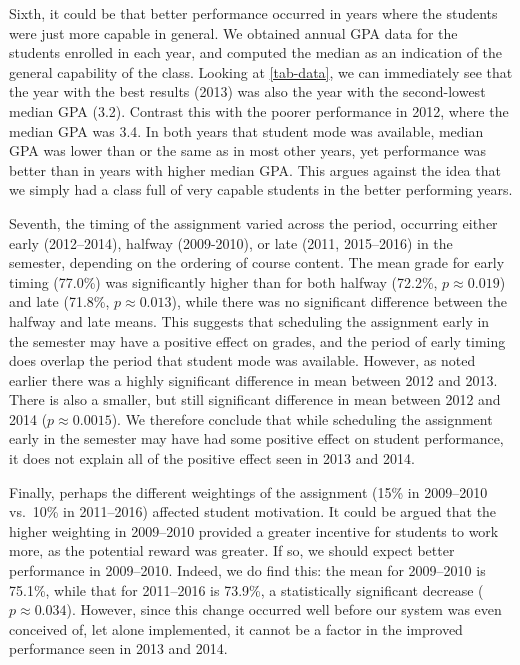 \documentclass[sigconf, authordraft, capitalise]{acmart}
\begin{document}
Sixth, it could be that better performance occurred in years where the students were just more capable in general. We obtained annual GPA data for the students enrolled in each year, and computed the median as an indication of the general capability of the class. Looking at \cref{tab-data}, we can immediately see that the year with the best results (2013) was also the year with the second-lowest median GPA (3.2). Contrast this with the poorer performance in 2012, where the median GPA was 3.4. In both years that student mode was available, median GPA was lower than or the same as in most other years, yet performance was better than in years with higher median GPA. This argues against the idea that we simply had a class full of very capable students in the better performing years.

Seventh, the timing of the assignment varied across the period, occurring either early (2012--2014), halfway (2009-2010), or late (2011, 2015--2016) in the semester, depending on the ordering of course content. The mean grade for early timing (77.0\%) was significantly higher than for both halfway (72.2\%, \(p \approx 0.019\)) and late (71.8\%, \(p \approx 0.013\)), while there was no significant difference between the halfway and late means. This suggests that scheduling the assignment early in the semester may have a positive effect on grades, and the period of early timing does overlap the period that student mode was available. However, as noted earlier there was a highly significant difference in mean between 2012 and 2013. There is also a smaller, but still significant difference in mean between 2012 and 2014 (\(p \approx 0.0015\)). We therefore conclude that while scheduling the assignment early in the semester may have had some positive effect on student performance, it does not explain all of the positive effect seen in 2013 and 2014.

Finally, perhaps the different weightings of the assignment (15\% in 2009--2010 vs.\ 10\% in 2011--2016) affected student motivation. It could be argued that the higher weighting in 2009--2010 provided a greater incentive for students to work more, as the potential reward was greater. If so, we should expect better performance in 2009--2010. Indeed, we do find this: the mean for 2009--2010 is 75.1\%, while that for 2011--2016 is 73.9\%, a statistically significant decrease (\(p \approx 0.034\)). However, since this change occurred well before our system was even conceived of, let alone implemented, it cannot be a factor in the improved performance seen in 2013 and 2014.
\end{document}
